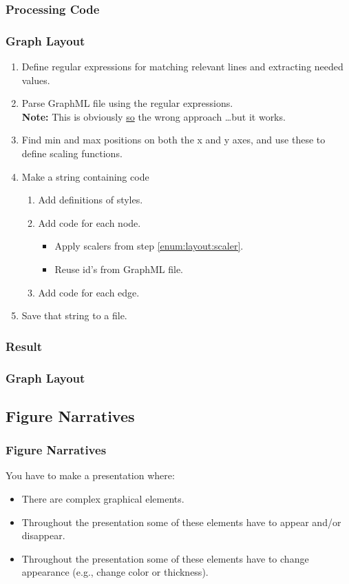 {\subsubsection{Processing Code}
\begin{frame}[fragile]
  \frametitle{Graph Layout }
  \vspace{3mm}
  \begin{enumerate}
    \item Define regular expressions for matching relevant lines and extracting needed values.
    \item Parse GraphML file using the regular expressions.
          \\
          \textbf{Note:} This is obviously \underline{so} the wrong approach \ldots but it works.
    \item \label{enum:layout:scaler} Find min and max positions on both the x and y axes, and use these to define scaling functions.
    \item Make a string containing \TikZ code
      \begin{enumerate}
        \item Add definitions of styles.
        \item Add code for each node.
          \begin{itemize}
            \item Apply scalers from step \ref{enum:layout:scaler}.
            \item Reuse id's from GraphML file.
          \end{itemize}
        \item Add code for each edge.
      \end{enumerate}
    \item Save that string to a file.
  \end{enumerate}
\end{frame}

\subsubsection{Result}
\begin{frame}[fragile]
  \frametitle{Graph Layout }
  \vspace{12mm}
  
\end{frame}

\subsection{Figure Narratives}
\begin{frame}[fragile]
  \frametitle{Figure Narratives}
  \vspace{3mm}
  You have to make a presentation where:
  \begin{itemize}
    \item There are complex graphical elements.
    \item Throughout the presentation some of these elements have to appear and/or disappear.
    \item Throughout the presentation some of these elements have to change appearance (e.g., change color or thickness).
  \end{itemize}
  

\end{frame}}

